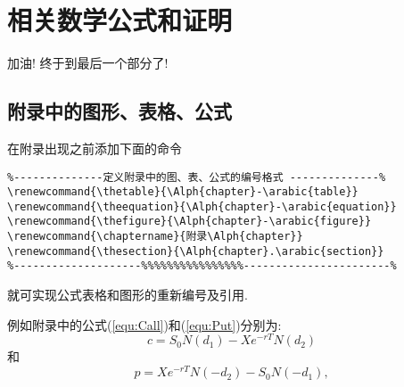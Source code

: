 
%
%


\chapter{相关数学公式和证明}
加油! 终于到最后一个部分了!
\section{附录中的图形、表格、公式}
在附录出现之前添加下面的命令
\begin{verbatim}
%--------------定义附录中的图、表、公式的编号格式 --------------%
\renewcommand{\thetable}{\Alph{chapter}-\arabic{table}}
\renewcommand{\theequation}{\Alph{chapter}-\arabic{equation}}
\renewcommand{\thefigure}{\Alph{chapter}-\arabic{figure}}
\renewcommand{\chaptername}{附录\Alph{chapter}}
\renewcommand{\thesection}{\Alph{chapter}.\arabic{section}}
%--------------------%%%%%%%%%%%%%%%%-----------------------%
\end{verbatim}
就可实现公式表格和图形的重新编号及引用.

例如附录中的公式(\ref{equ:Call})和(\ref{equ:Put})分别为:
\begin{equation}\label{equ:Call}
  c=S_0N(d_1)-X e^{-r T}N(d_2)
\end{equation}
和
\begin{equation}\label{equ:Put}
  p=X e^{-r T}N(-d_2)-S_0N(-d_1),
\end{equation}

